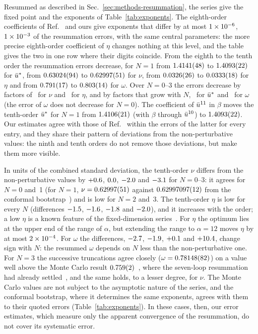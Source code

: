 Resummed as described in Sec.~\ref{sec:methods-resummation}, the series give the fixed point and the exponents of
Table~\ref{tab:exponents}. The eighth-order coefficients of Ref.~\cite{Phi4tools2024} and ours give
exponents that differ by at most $1\times10^{-6}$, $1\times10^{-3}$ of the resummation errors, with the same central parameters:
the more precise eighth-order coefficient of $\eta$ changes nothing at this level, and the table gives the two in one
row where their digits coincide. From the eighth to the tenth order the resummation errors decrease, for $N=1$ from
$1.4141(48)$ to $1.4093(22)$ for $\bar u^*$, from $0.63024(94)$ to $0.62997(51)$ for $\nu$, from $0.0326(26)$ to
$0.0333(18)$ for $\eta$ and from $0.791(17)$ to $0.803(14)$ for $\omega$. Over $N=0$--3 the errors decrease by
factors of \rsGainNu\ for $\nu$ and \rsGainEta\ for $\eta$, and by factors that grow with $N$, \rsGainUstar\ for
$\bar u^*$ and \rsGainOmega\ for $\omega$ (the error of $\omega$ does not decrease for $N=0$). The coefficient of
$\bar u^{11}$ in $\beta$ moves the tenth-order $\bar u^*$ for $N=1$ from $1.4106(21)$ (with $\beta$ through
$\bar u^{10}$) to $1.4093(22)$. Our estimates agree with those of Ref.~\cite{GuidaZinnJustin1998} within the errors
of the latter for every entry, and they share their pattern of deviations from the non-perturbative values: the ninth
and tenth orders do not remove those deviations, but make them more visible.

In units of the combined standard deviation, the tenth-order $\nu$ differs from the non-perturbative values by
$+0.6$, $0.0$, $-2.0$ and $-3.1$ for $N=0$--3: it agrees for $N=0$ and~1 (for
$N=1$, $\nu=0.62997(51)$ against $0.62997097(12)$ from the conformal bootstrap~\cite{ChangEtAl2025}) and is
low for $N=2$ and~3. The tenth-order $\eta$ is low for every $N$ (differences $-1.5$, $-1.6$,
$-1.8$ and $-2.0$), and it increases with the order; a low $\eta$ is a known feature of the
fixed-dimension series~\cite{LeGuillouZinnJustin1980,GuidaZinnJustin1998}. For $\eta$ the optimum lies at the upper
end of the range of $\alpha$, but extending the range to $\alpha=12$ moves $\eta$ by at most $2\times10^{-4}$. For
$\omega$ the differences, $-2.7$, $-1.9$, $+0.1$ and $+10.4$, change
sign with $N$: the resummed $\omega$ depends on $N$ less than the non-perturbative one. For $N=3$ the successive
truncations agree closely ($\omega=0.78148(82)$) on a value well above the Monte Carlo result
$0.759(2)$~\cite{Hasenbusch2020}, where the seven-loop resummation had already
settled~\cite{GuidaZinnJustin1998}, and the same holds, to a lesser degree, for $\nu$. The Monte Carlo values are not
subject to the asymptotic nature of the series, and the conformal bootstrap, where it determines the same exponents,
agrees with them to their quoted errors (Table~\ref{tab:exponents}). In these cases, then, our error estimates, which
measure only the apparent convergence of the resummation, do not cover its systematic error.

